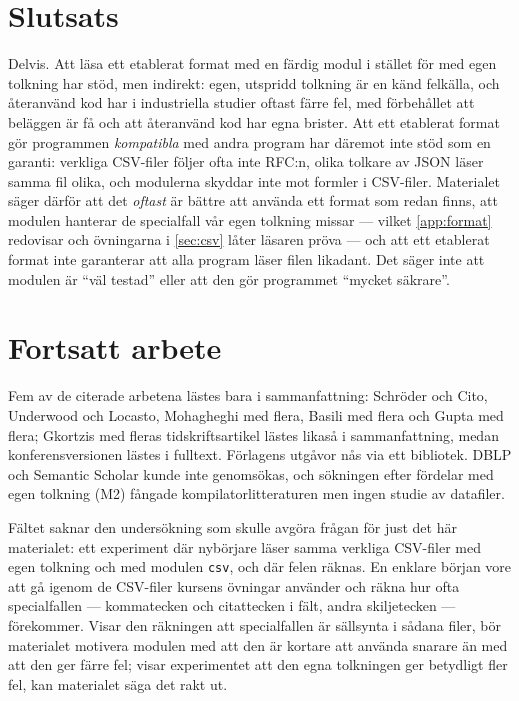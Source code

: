 \section{Slutsats}
\label{sec:sf-slutsats}

Delvis.  Att läsa ett etablerat format med en färdig modul i stället för
med egen tolkning har stöd, men indirekt: egen, utspridd tolkning är en
känd felkälla\autocite{Momot2016Turrets,SchroderCito2025}, och
återanvänd kod har i industriella studier oftast färre
fel\autocite[471]{MohagheghiConradi2007}, med förbehållet att beläggen
är få och att återanvänd kod har egna brister\autocite[187]{Gkortzis2019Reuse}.
Att ett etablerat format gör programmen \emph{kompatibla} med andra
program har däremot inte stöd som en garanti: verkliga CSV-filer följer
ofta inte RFC:n\autocite{vandenBurg2019CSV}\autocite[1872]{Vitagliano2023Pollock},
olika tolkare av JSON läser samma fil olika\autocite[1117]{Moller2024JSON},
och modulerna skyddar inte mot formler i CSV-filer\autocite[239]{Karl2025Formula}.
Materialet säger därför att det \emph{oftast} är bättre att använda ett
format som redan finns, att modulen hanterar de specialfall vår egen
tolkning missar --- vilket \cref{app:format} redovisar och övningarna
i \cref{sec:csv} låter läsaren pröva --- och att
ett etablerat format inte garanterar att alla program läser filen
likadant.  Det säger inte att modulen är \enquote{väl testad} eller att
den gör programmet \enquote{mycket säkrare}.

\section{Fortsatt arbete}
\label{sec:sf-fortsatt}

Fem av de citerade arbetena lästes bara i sammanfattning: Schröder och
Cito\autocite{SchroderCito2025}, Underwood och
Locasto\autocite{Underwood2016Shotgun}, Mohagheghi med
flera\autocite{Mohagheghi2004Reuse}, Basili med
flera\autocite{Basili1996Reuse} och Gupta med flera\autocite{Gupta2009Reuse};
Gkortzis med fleras tidskriftsartikel\autocite{Gkortzis2021Reuse} lästes
likaså i sammanfattning, medan konferensversionen lästes i fulltext.
Förlagens utgåvor nås via ett bibliotek.  DBLP och Semantic Scholar
kunde inte genomsökas, och sökningen efter fördelar med egen tolkning
(M2) fångade kompilatorlitteraturen men ingen studie av datafiler.

Fältet saknar den undersökning som skulle avgöra frågan för just det här
materialet: ett experiment där nybörjare läser samma verkliga CSV-filer
med egen tolkning och med modulen \texttt{csv}, och där
felen räknas.  En enklare början vore att gå igenom de CSV-filer kursens
övningar använder och räkna hur ofta specialfallen --- kommatecken och
citattecken i fält, andra skiljetecken --- förekommer.  Visar den
räkningen att specialfallen är sällsynta i sådana filer, bör materialet
motivera modulen med att den är kortare att använda snarare än med att
den ger färre fel; visar experimentet att den egna tolkningen ger
betydligt fler fel, kan materialet säga det rakt ut.

